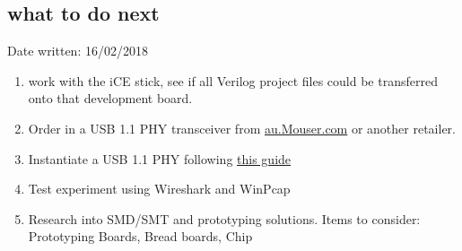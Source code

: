 \documentclass[10pt,a4paper]{article}
\begin{document}
\subsection{what to do next}
Date written: 16/02/2018
\begin{enumerate}
	\item work with the iCE stick, see if all Verilog project files could be transferred onto that development board.
	\item Order in a USB 1.1 PHY transceiver from \href{https://au.mouser.com/Semiconductors/Interface-ICs/USB-Interface-IC/_/N-45lw3Z1yzvvqx?P=1yxy7lq&pop=3nh2d&Ns=Pricing|0}{au.Mouser.com} or another retailer.
	\item Instantiate a USB 1.1 PHY following \href{http://www.xess.com/projects/fpga-usb-v2-project/}{this guide}
	\item Test experiment using Wireshark and WinPcap
	\item Research into SMD/SMT and prototyping solutions. Items to consider: Prototyping Boards, Bread boards, Chip 
\end{enumerate}
\end{document}
